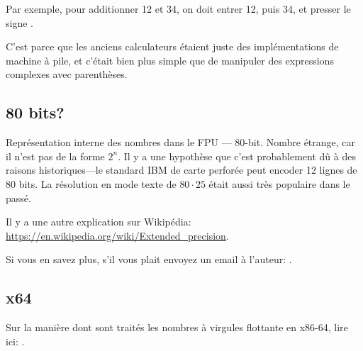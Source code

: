 Par exemple, pour additionner 12 et 34, on doit entrer 12, puis 34, et presser le
signe .

C'est parce que les anciens calculateurs étaient juste des implémentations de machine
à pile, et c'était bien plus simple que de manipuler des expressions complexes avec
parenthèses.

\subsection{80 bits?}


Représentation interne des nombres dans le FPU --- 80-bit.
Nombre étrange, car il n'est pas de la forme $2^n$.
Il y a une hypothèse que c'est probablement dû à des raisons historiques---le standard
IBM de carte perforée peut encoder 12 lignes de 80 bits.
La résolution en mode texte de $80\cdot 25$ était aussi très populaire dans le passé.

Il y a une autre explication sur Wikipédia: \url{https://en.wikipedia.org/wiki/Extended_precision}.

Si vous en savez plus, s'il vous plait envoyez un email à l'auteur: \EMAIL{}.

\subsection{x64}

Sur la manière dont sont traités les nombres à virgules flottante en x86-64, lire
ici: .



